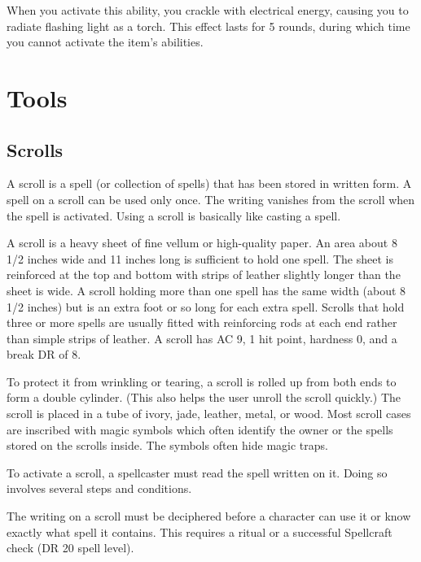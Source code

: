         When you activate this ability, you crackle with electrical energy, causing you to radiate flashing light as a torch.
        This effect lasts for 5 rounds, during which time you cannot activate the item's abilities.


\section{Tools}

    \subsection{Scrolls}
        A scroll is a spell (or collection of spells) that has been stored in written form.
        A spell on a scroll can be used only once.
        The writing vanishes from the scroll when the spell is activated.
        Using a scroll is basically like casting a spell.

         A scroll is a heavy sheet of fine vellum or high-quality paper.
        An area about 8 1/2 inches wide and 11 inches long is sufficient to hold one spell.
        The sheet is reinforced at the top and bottom with strips of leather slightly longer than the sheet is wide.
        A scroll holding more than one spell has the same width (about 8 1/2 inches) but is an extra foot or so long for each extra spell.
        Scrolls that hold three or more spells are usually fitted with reinforcing rods at each end rather than simple strips of leather.
        A scroll has AC 9, 1 hit point, hardness 0, and a break DR of 8.

        To protect it from wrinkling or tearing, a scroll is rolled up from both ends to form a double cylinder.
        (This also helps the user unroll the scroll quickly.) The scroll is placed in a tube of ivory, jade, leather, metal, or wood.
        Most scroll cases are inscribed with magic symbols which often identify the owner or the spells stored on the scrolls inside.
        The symbols often hide magic traps.

         To activate a scroll, a spellcaster must read the spell written on it.
        Doing so involves several steps and conditions.

         The writing on a scroll must be deciphered before a character can use it or know exactly what spell it contains.
        This requires a  ritual or a successful Spellcraft check (DR 20 \add spell level).

